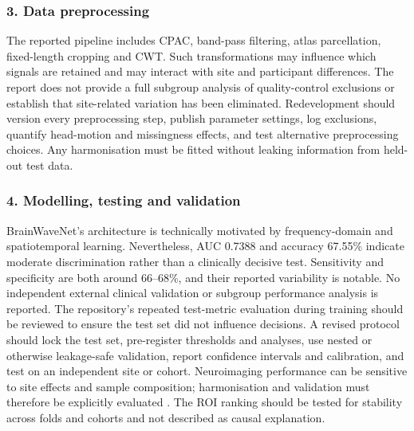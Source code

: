 \documentclass[11pt,a4paper]{article}
\begin{document}
\subsubsection{3. Data preprocessing}
The reported pipeline includes CPAC, band-pass filtering, atlas parcellation, fixed-length cropping and CWT. Such transformations may influence which signals are retained and may interact with site and participant differences. The report does not provide a full subgroup analysis of quality-control exclusions or establish that site-related variation has been eliminated. Redevelopment should version every preprocessing step, publish parameter settings, log exclusions, quantify head-motion and missingness effects, and test alternative preprocessing choices. Any harmonisation must be fitted without leaking information from held-out test data.

\subsubsection{4. Modelling, testing and validation}
BrainWaveNet's architecture is technically motivated by frequency-domain and spatiotemporal learning. Nevertheless, AUC 0.7388 and accuracy 67.55\% indicate moderate discrimination rather than a clinically decisive test. Sensitivity and specificity are both around 66--68\%, and their reported variability is notable. No independent external clinical validation or subgroup performance analysis is reported. The repository's repeated test-metric evaluation during training should be reviewed to ensure the test set did not influence decisions. A revised protocol should lock the test set, pre-register thresholds and analyses, use nested or otherwise leakage-safe validation, report confidence intervals and calibration, and test on an independent site or cohort. Neuroimaging performance can be sensitive to site effects and sample composition; harmonisation and validation must therefore be explicitly evaluated \parencite{abraham2017,abideharmonization2022}. The ROI ranking should be tested for stability across folds and cohorts and not described as causal explanation.
\end{document}
